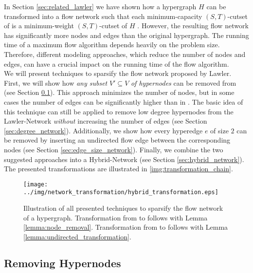 
In Section \ref{sec:related_lawler} we have shown how a hypergraph $H$ can be transformed into 
a flow network  such that each minimum-capacity $(S,T)$-cutset of  is a 
minimum-weight $(S,T)$-cutset of $H$ \cite{lawler1973}. However, the resulting flow
network has significantly more nodes and edges than the original hypergraph. The running time
of a maximum flow algorithm depends heavily on the problem size. 
Therefore, different modeling approaches, which reduce the number of nodes and edges,
can have a crucial impact on the running time of the flow algorithm. \\
We will present techniques to sparsify the flow network 
proposed by Lawler. First, we will show how \emph{any subset} $V' \subseteq V$ \emph{of hypernodes} can be removed 
from  (see Section \ref{sec:heuer_network}). This approach minimizes
the number of nodes, but in some cases the number of edges can be
significantly higher than in . The basic idea of this technique 
can still be applied to remove low degree hypernodes from the Lawler-Network \emph{without} 
increasing the number of edges (see Section \ref{sec:degree_network}). Additionally, we show
how every hyperedge $e$ of size $2$ can be removed by inserting an undirected flow edge between
the corresponding nodes (see Section \ref{sec:edge_size_network}). 
Finally, we combine the two suggested approaches into a Hybrid-Network 
(see Section \ref{sec:hybrid_network}). The presented transformations are illustrated in
\autoref{img:transformation_chain}.

\begin{figure}[ht!]
\centering
\texttt{[image: ../img/network\_transformation/hybrid\_transformation.eps]}
\caption{Illustration of all presented techniques to sparsify the flow network of a hypergraph.
         Transformation from  to  follows with Lemma \ref{lemma:node_removal}.
         Transformation from  to  follows with Lemma \ref{lemma:undirected_transformation}.}
\label{img:transformation_chain} 
\end{figure}

\subsection{Removing Hypernodes}
\label{sec:heuer_network}

